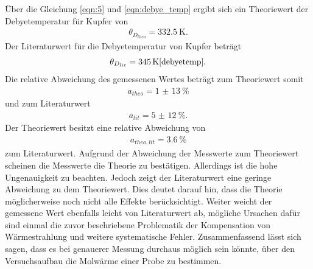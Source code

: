 Über die Gleichung \eqref{eqn:5} und \eqref{eqn:debye_temp}
ergibt sich ein Theoriewert der Debyetemperatur für Kupfer von
\begin{align}
\theta_{D_{theo}} = \SI{332.5}{\kelvin}.
\end{align}
Der Literaturwert für die Debyetemperatur von
Kupfer beträgt
\begin{align}
\theta_{D_{lit}} = \SI{345}{\kelvin} \text{\cite{debyetemp}.}
\end{align}
Die relative Abweichung des gemessenen Wertes beträgt zum Theoriewert somit
\begin{align}
a_{theo} = \SI{1(13)}{\percent}
\end{align}
und zum Literaturwert
\begin{align}
a_{lit}= \SI{5(12)}{\percent}.
\end{align}
Der Theoriewert besitzt eine relative Abweichung von
\begin{align}
a_{theo,lit}=\SI{3.6}{\percent}
\end{align}
zum Literaturwert.
Aufgrund der Abweichung der Messwerte zum Theoriewert
scheinen die Messwerte die Theorie zu bestätigen. Allerdings
ist die hohe Ungenauigkeit zu beachten. Jedoch zeigt
der Literaturwert eine geringe Abweichung zu dem Theoriewert.
Dies deutet darauf hin, dass die Theorie möglicherweise noch nicht alle
Effekte berücksichtigt. Weiter weicht der gemessene Wert ebenfalls leicht von Literaturwert ab,
mögliche Ursachen dafür sind einmal die zuvor beschriebene Problematik der Kompensation von Wärmestrahlung
und weitere systematische Fehler.
Zusammenfassend lässt sich sagen, dass es bei genauerer Messung
durchaus möglich sein könnte, über den Versuchsaufbau
die Molwärme einer Probe zu bestimmen.
